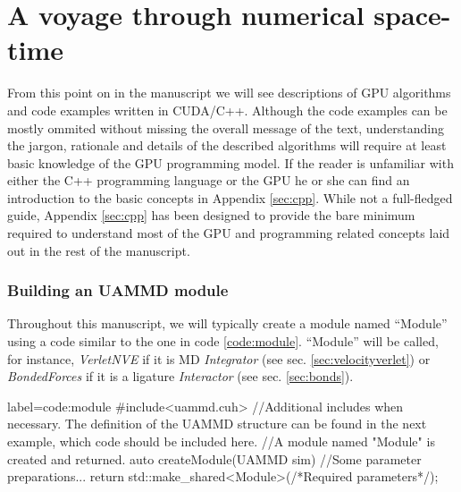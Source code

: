 \documentclass[ twoside,openright,titlepage,numbers=noenddot,%
headinclude,footinclude,cleardoublepage=empty,abstract=on,
BCOR=5mm,paper=a4,fontsize=11pt, dvipsnames
]{scrreprt}
\begin{document}
%

\part{A voyage through numerical space-time}



From this point on in the manuscript we will see descriptions of GPU algorithms and code examples written in CUDA/C++. Although the code examples can be mostly ommited without missing the overall message of the text, understanding the jargon, rationale and details of the described algorithms will require at least basic knowledge of the GPU programming model. If the reader is unfamiliar with either the C++ programming language or the GPU he or she can find an introduction to the basic concepts in Appendix \ref{sec:cpp}. While not a full-fledged guide, Appendix \ref{sec:cpp} has been designed to provide the bare minimum required to understand most of the GPU and programming related concepts laid out in the rest of the manuscript.

\section{Building an UAMMD module}

Throughout this manuscript, we will typically create a module named ``Module'' using a code similar to the one in code \ref{code:module}. ``Module'' will be called, for instance, \emph{VerletNVE} if it is \gls{MD} \emph{Integrator} (see sec. \ref{sec:velocityverlet}) or \emph{BondedForces} if it is a ligature \emph{Interactor} (see sec. \ref{sec:bonds}).

\begin{code2}{label=code:module}
#include<uammd.cuh>
//Additional includes when necessary. The definition of the UAMMD structure can be found in the next example, which code should be included here.
//A module named "Module" is created and returned.
auto createModule(UAMMD sim){
  //Some parameter preparations...
  return std::make_shared<Module>(/*Required parameters*/);
}
\end{code2}
\end{document}
